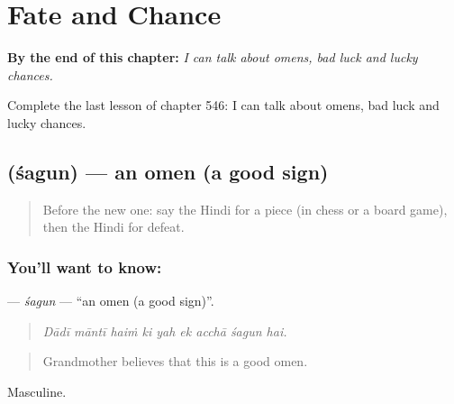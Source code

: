 
\chapter{Fate and Chance}
\label{ch:hi-fate-and-chance}

\begin{chapteropening}
\textbf{By the end of this chapter:} \emph{I can talk about omens, bad luck and lucky chances.}

Complete the last lesson of chapter 546: I can talk about omens, bad luck and lucky chances.
\end{chapteropening}

\section[\texorpdfstring{\hi{शगुन} (śagun)}{शगुन (śagun)}]{ (śagun) — an omen (a good sign)}

\label{lesson:HI-C546-sagun}



\begin{quote}
Before the new one: say the Hindi for a piece (in chess or a board game), then the Hindi for defeat.
\end{quote}

\subsection*{You'll want to know: }
\textbf{} — \emph{śagun} — \textquotedblleft{}an omen (a good sign)\textquotedblright{}.

\begin{quote}
        
\end{quote}

\begin{quote}
\emph{Dādī māntī haiṁ ki yah ek acchā śagun hai.}
\end{quote}

\begin{quote}
Grandmother believes that this is a good omen.
\end{quote}

Masculine.

